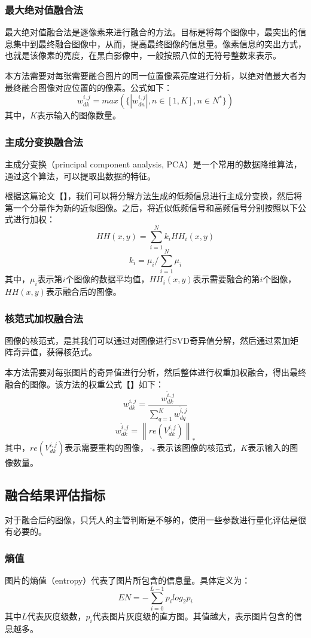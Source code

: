 \documentclass{xduugthesis}
\begin{document}
\subsubsection{最大绝对值融合法}
最大绝对值融合法是逐像素来进行融合的方法。目标是将每个图像中，最突出的信息集中到最终融合图像中，从而，提高最终图像的信息量。像素信息的突出方式，也就是该像素的亮度，在黑白影像中，一般按照八位的无符号整数来表示。\par
本方法需要对每张需要融合图片的同一位置像素亮度进行分析，以绝对值最大者为最终融合图像对应位置的的像素。公式如下：
$$w_{dk}^{i,j}=max\left(\{\left|w_{dn}^{i,j}\right|,n\in\left[1,K\right],n\in N^\ast\}\right)$$
其中，$K$表示输入的图像数量。
\subsubsection{主成分变换融合法}
主成分变换（principal component analysis, PCA）是一个常用的数据降维算法，通过这个算法，可以提取出数据的特征。\par
根据这篇论文【】，我们可以将分解方法生成的低频信息进行主成分变换，然后将第一个分量作为新的近似图像。之后，将近似低频信号和高频信号分别按照以下公式进行加权：
$$HH(x,y)=\sum_{i=1}^{N}k_iHH_i(x,y)$$
$$k_i=\mu_i/\sum_{i=1}^{N}\mu_i$$
其中，$\mu_i$表示第$i$个图像的数据平均值，$HH_i(x,y)$表示需要融合的第$i$个图像，$HH(x,y)$表示融合后的图像。
\subsubsection{核范式加权融合法}
图像的核范式，是其我们可以通过对图像进行SVD奇异值分解，然后通过累加矩阵奇异值，获得核范式。\par
本方法需要对每张图片的奇异值进行分析，然后整体进行权重加权融合，得出最终融合的图像。该方法的权重公式【】如下：
$$w_{dk}^{i,j}=\frac{w_{dk}^{\hat{i},j}}{\sum_{q=1}^{K}w_{dq}^{\hat{i},j}}$$
$$w_{dk}^{\hat{i},j}={\left\| re\left(V_{dk}^{i,j}\right)\right\|}_*$$
其中，$re\left(V_{dk}^{i,j}\right)$表示需要重构的图像，$\cdot_*$表示该图像的核范式，$K$表示输入的图像数量。\par
\subsection{融合结果评估指标}
对于融合后的图像，只凭人的主管判断是不够的，使用一些参数进行量化评估是很有必要的。\par
\subsubsection{熵值}
图片的熵值（entropy）代表了图片所包含的信息量。具体定义为：
$$EN=-\sum_{i=0}^{L-1}p_ilog_2p_i$$
其中$L$代表灰度级数，$p_i$代表图片灰度级的直方图。其值越大，表示图片包含的信息越多。\par
\end{document}
